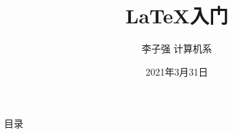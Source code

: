 \documentclass{libs/SUSTech_format}
\title[\LaTeX 入门]{\huge \textbf{\LaTeX 入门}}
\author{李子强 \hspace{0.5em}计算机系}
\institute[SUSTech]{
    \normalsize
    南方科技大学
}
\date{2021年3月31日}
\begin{document}



{
    \begin{frame}
    \maketitle
    \end{frame}
}

\begin{frame}{目录}
    \begin{multicols}{2}
        \tableofcontents
    \end{multicols}
\end{frame}




\end{document}
